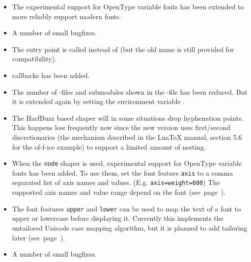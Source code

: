 \begin{itemize}
  \item The experimental support for OpenType variable fonts has been extended
    to more reliably support modern fonts.
  \item A number of small bugfixes.
 \end{itemize}
\endsubsection

\begin{itemize}
  \item The entry point is called  instead of
      (but the old name is still provided for compatibility).
  \item  {} callbacks has been added.
  \item  The number of -files and submodules shown in the -file has been reduced. But it
   is extended again by setting the environment variable .
  \item The HarfBuzz based shaper will in some situations drop hyphenation
   points. This happens less frequently now since the new version uses
   first/second discretionaries (the mechanism described in the LuaTeX manual,
   section 5.6 for the of-f-ice example) to support a limited amount of
   nesting.
  \item When the \texttt{node} shaper is used, experimental support for OpenType variable
   fonts has been added. To use them, set the font feature \texttt{axis} to
   a comma separated list of axis names and values. (E.g.  \texttt{axis={weight=600}})
   The supported axis names and value range depend on the font (see~page~\pageref{variablefonts}).
 \item The font features \texttt{upper} and \texttt{lower} can be used to map
   the text of a font to upper or lowercase before displaying it. Currently
   this implements the untailored Unicode case mapping algorithm, but it is
   planned to add tailoring later (see~page~\pageref{upperlower}).
  \item A number of small bugfixes.
 \end{itemize}
\endsubsection

